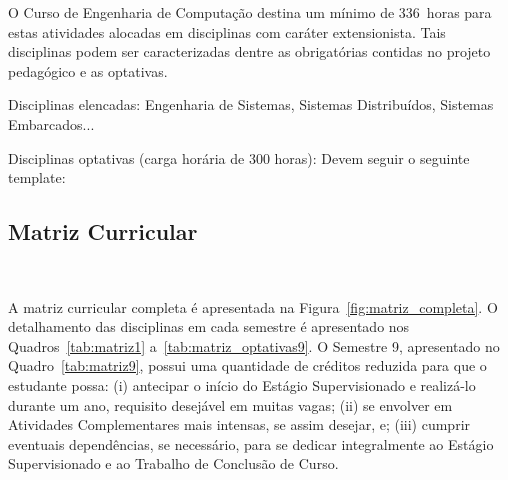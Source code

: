 O Curso de Engenharia de Computação destina um mínimo de 336~horas para estas atividades alocadas em disciplinas com caráter extensionista. Tais disciplinas podem ser caracterizadas dentre as obrigatórias contidas no projeto pedagógico e as optativas.

Disciplinas elencadas: Engenharia de Sistemas, Sistemas Distribuídos, Sistemas Embarcados...

Disciplinas optativas (carga horária de 300 horas): Devem seguir o seguinte template:




\subsection{Matriz Curricular}~\label{sec:matriz_curricular}


A matriz curricular completa é apresentada na Figura~\ref{fig:matriz_completa}. O detalhamento das disciplinas em cada semestre é apresentado nos Quadros~\ref{tab:matriz1} a~\ref{tab:matriz_optativas9}. O Semestre 9, apresentado no Quadro~\ref{tab:matriz9}, possui uma quantidade de créditos reduzida para que o estudante possa: (i) antecipar o início do Estágio Supervisionado e realizá-lo durante um ano, requisito desejável em muitas vagas; (ii) se envolver em Atividades Complementares mais intensas, se assim desejar, e; (iii) cumprir eventuais dependências, se necessário, para se dedicar integralmente ao Estágio Supervisionado e ao Trabalho de Conclusão de Curso.


